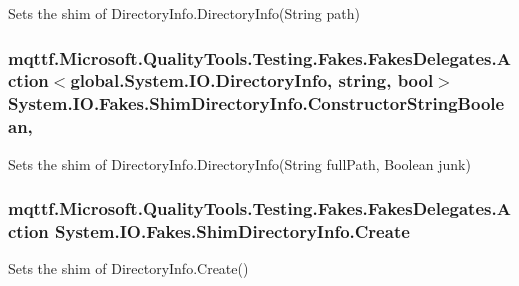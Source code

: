 Sets the shim of Directory\-Info.\-Directory\-Info(\-String path)

\hypertarget{class_system_1_1_i_o_1_1_fakes_1_1_shim_directory_info_add65e978e8c4420be658b0a033a08abd}{
\subsubsection[{Constructor\-String\-Boolean}]{\setlength{\rightskip}{0pt plus 5cm}mqttf.\-Microsoft.\-Quality\-Tools.\-Testing.\-Fakes.\-Fakes\-Delegates.\-Action$<$global.\-System.\-I\-O.\-Directory\-Info, string, bool$>$ System.\-I\-O.\-Fakes.\-Shim\-Directory\-Info.\-Constructor\-String\-Boolean\hspace{0.3cm}{\ttfamily [static]}, {\ttfamily [set]}}}\label{class_system_1_1_i_o_1_1_fakes_1_1_shim_directory_info_add65e978e8c4420be658b0a033a08abd}


Sets the shim of Directory\-Info.\-Directory\-Info(\-String full\-Path, Boolean junk)

\hypertarget{class_system_1_1_i_o_1_1_fakes_1_1_shim_directory_info_a4253f2442987aa323efab668c26c50d3}{
\subsubsection[{Create}]{\setlength{\rightskip}{0pt plus 5cm}mqttf.\-Microsoft.\-Quality\-Tools.\-Testing.\-Fakes.\-Fakes\-Delegates.\-Action System.\-I\-O.\-Fakes.\-Shim\-Directory\-Info.\-Create\hspace{0.3cm}{\ttfamily [set]}}}\label{class_system_1_1_i_o_1_1_fakes_1_1_shim_directory_info_a4253f2442987aa323efab668c26c50d3}


Sets the shim of Directory\-Info.\-Create()

